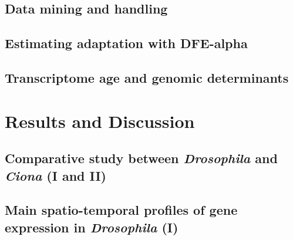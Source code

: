 \documentclass[officiallayout]{tktla_modified}
\begin{document}
	\section{Data mining and handling}
	

	\section{Estimating adaptation with DFE-alpha}
	

	\section{Transcriptome age and genomic determinants}
	

%
\clearpage

	
\chapter{Results and Discussion}

%	
%	

%	

\section{Comparative study between \textit{Drosophila} and \textit{Ciona} (I and II)}
	

\section{Main spatio-temporal profiles of gene expression in \textit{Drosophila} (I)}
	
\end{document}
